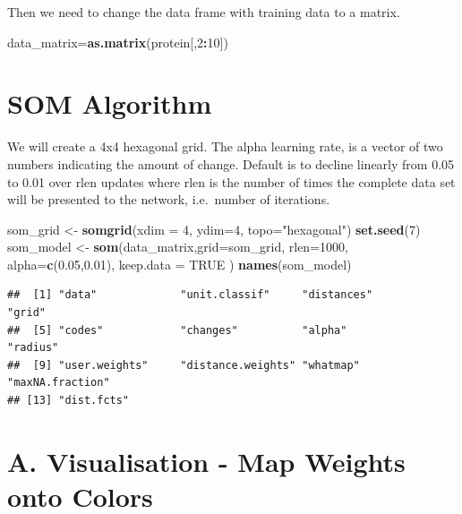 \documentclass[
]{book}
\newenvironment{Shaded}{\begin{snugshade}}{\end{snugshade}}
\newcommand{\DataTypeTok}[1]{\textcolor[rgb]{0.13,0.29,0.53}{#1}}
\newcommand{\DecValTok}[1]{\textcolor[rgb]{0.00,0.00,0.81}{#1}}
\newcommand{\FloatTok}[1]{\textcolor[rgb]{0.00,0.00,0.81}{#1}}
\newcommand{\KeywordTok}[1]{\textcolor[rgb]{0.13,0.29,0.53}{\textbf{#1}}}
\newcommand{\NormalTok}[1]{#1}
\newcommand{\OperatorTok}[1]{\textcolor[rgb]{0.81,0.36,0.00}{\textbf{#1}}}
\newcommand{\OtherTok}[1]{\textcolor[rgb]{0.56,0.35,0.01}{#1}}
\newcommand{\StringTok}[1]{\textcolor[rgb]{0.31,0.60,0.02}{#1}}
\begin{document}
Then we need to change the data frame with training data to a matrix.

\begin{Shaded}
\begin{Highlighting}[]
\NormalTok{data_matrix=}\KeywordTok{as.matrix}\NormalTok{(protein[,}\DecValTok{2}\OperatorTok{:}\DecValTok{10}\NormalTok{])}
\end{Highlighting}
\end{Shaded}

\hypertarget{som-algorithm}{%
\section{SOM Algorithm}\label{som-algorithm}}

We will create a 4x4 hexagonal grid. The alpha learning rate, is a vector of two numbers indicating the amount of change. Default is to decline linearly from 0.05 to 0.01 over rlen updates where rlen is the number of times the complete data set will be presented to the network, i.e.~number of iterations.

\begin{Shaded}
\begin{Highlighting}[]
\NormalTok{som_grid <-}\StringTok{ }\KeywordTok{somgrid}\NormalTok{(}\DataTypeTok{xdim =} \DecValTok{4}\NormalTok{, }\DataTypeTok{ydim=}\DecValTok{4}\NormalTok{, }\DataTypeTok{topo=}\StringTok{"hexagonal"}\NormalTok{)}
\KeywordTok{set.seed}\NormalTok{(}\DecValTok{7}\NormalTok{)}
\NormalTok{som_model <-}\StringTok{ }\KeywordTok{som}\NormalTok{(data_matrix,}\DataTypeTok{grid=}\NormalTok{som_grid, }
                 \DataTypeTok{rlen=}\DecValTok{1000}\NormalTok{, }
                 \DataTypeTok{alpha=}\KeywordTok{c}\NormalTok{(}\FloatTok{0.05}\NormalTok{,}\FloatTok{0.01}\NormalTok{),}
                 \DataTypeTok{keep.data =} \OtherTok{TRUE}
\NormalTok{                 )}
\KeywordTok{names}\NormalTok{(som_model)}
\end{Highlighting}
\end{Shaded}

\begin{verbatim}
##  [1] "data"             "unit.classif"     "distances"        "grid"            
##  [5] "codes"            "changes"          "alpha"            "radius"          
##  [9] "user.weights"     "distance.weights" "whatmap"          "maxNA.fraction"  
## [13] "dist.fcts"
\end{verbatim}

\hypertarget{a.-visualisation---map-weights-onto-colors}{%
\section{A. Visualisation - Map Weights onto Colors}\label{a.-visualisation---map-weights-onto-colors}}
\end{document}
